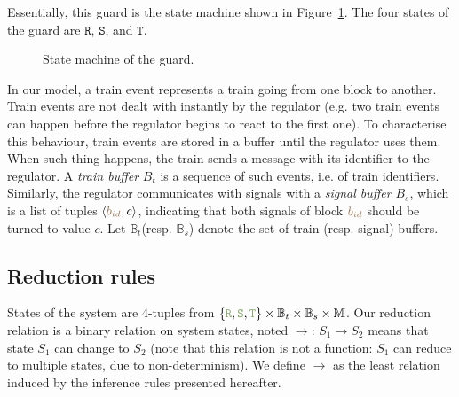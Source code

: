 \documentclass[runningheads]{llncs}
\newcommand{\tuple}[1]{\ensuremath{\langle #1\rangle}}
\newcommand{\modelSet}{\ensuremath{\mathbb{M}}}
\newcommand{\posFmt}[1]{{\color{poscolor}{#1}}}
\newcommand{\bid}[1]{\ensuremath{\posFmt{b_{#1}}}}
\newcommand{\guardFmt}[1]{{\color{guardcolor} \ensuremath{\mathtt{#1}}}}
\newcommand{\guardT}{\guardFmt{T}}
\newcommand{\guardS}{\guardFmt{S}}
\newcommand{\guardR}{\guardFmt{R}}
\newcommand{\bufferFmt}[1]{#1}
\newcommand{\bufTrainSet}{\ensuremath{\bufferFmt{\mathbb{B}_t}}\xspace}
\newcommand{\bufSigSet}{\ensuremath{\bufferFmt{\mathbb{B}_s}}\xspace}
\newcommand{\bufTrain}{\ensuremath{\bufferFmt{B_t}}\xspace}
\newcommand{\bufSig}{\ensuremath{\bufferFmt{B_s}}\xspace}
\newcommand{\reduces}{\ensuremath{\rightarrow}}
\begin{document}
Essentially, this guard is the state machine shown in Figure~\ref{fig:state_machine_guard}. The four states of the guard are \guardR, \guardS, and \guardT.

\begin{figure}
	\centering
	\caption{State machine of the guard.}
	\label{fig:state_machine_guard}
\end{figure}

In our model, a train event represents a train going from one block to another. Train events are not dealt with instantly by the regulator (e.g. two train events can happen before the regulator begins to react to the first one). To characterise this behaviour, train events are stored in a buffer until the regulator uses them. When such thing happens, the train sends a message with its identifier to the regulator. A \emph{train buffer} \bufTrain is a sequence of such events, i.e. of train identifiers.
Similarly, the regulator communicates with signals with a \emph{signal buffer} \bufSig, which is a list of tuples $\tuple{\bid{id}, c}$, indicating that both signals of block $\bid{id}$ should be turned to value $c$. Let \bufTrainSet (resp. \bufSigSet) denote the set of train (resp. signal) buffers.

\subsection{Reduction rules}

States of the system are 4-tuples from $\{\guardR, \guardS, \guardT\} \times \bufTrainSet \times \bufSigSet \times \modelSet$. Our reduction relation is a binary relation on system states, noted $\reduces$: $S_1 \reduces S_2$ means that state $S_1$ can change to $S_2$ (note that this relation is not a function: $S_1$ can reduce to multiple states, due to non-determinism). We define $\reduces$ as the least relation induced by the inference rules presented hereafter.
\end{document}
